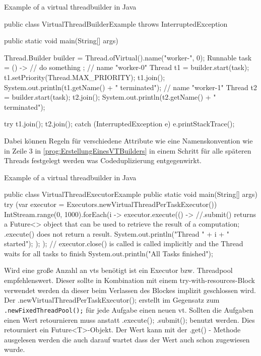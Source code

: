     \begin{program} [H]
        \caption{Example of a virtual threadbuilder in Java}
        \label{prog:ErstellungEinesVTBuilders}
    \begin{JavaCode}[language=Java, numbers=left]
public class VirtualThreadBuilderExample throws InterruptedException{
    public static void main(String[] args) {
        Thread.Builder builder = Thread.ofVirtual().name("worker-", 0);
        Runnable task = () -> {
            // do something
        };
        // name "worker-0"
        Thread t1 = builder.start(task);
        t1.setPriority(Thread.MAX_PRIORITY);   
        t1.join();
        System.out.println(t1.getName() + " terminated");
        // name "worker-1"
        Thread t2 = builder.start(task);   
        t2.join();  
        System.out.println(t2.getName() + " terminated");

        try {
            t1.join(); t2.join();
        } catch (InterruptedException e) {
            e.printStackTrace();
        }
    }
}
    \end{JavaCode}
    \end{program}

    Dabei können Regeln für verschiedene Attribute wie eine Namenskonvention wie in Zeile 3 in \ref{prog:ErstellungEinesVTBuilders}
    in einem Schritt für alle späteren Threads festgelegt werden was Codeduplizierung entgegenwirkt.

    \begin{program} [H]
        \caption{Example of a virtual threadbuilder in Java}
        \label{prog:ErstellungEinesExecutors}
    \begin{JavaCode}[language=Java, numbers=left]
public class VirtualThreadExecutorExample {
    public static void main(String[] args) {
        try (var executor = Executors.newVirtualThreadPerTaskExecutor()){
            IntStream.range(0, 1000).forEach(i -> {
                executor.execute(() -> {     //.submit() returns a Future<> object that can be used to retrieve the result of a computation; .execute() does not return a result.
                    System.out.println("Thread " + i + " started");
                });
            });
        }       // executor.close() is called is called implicitly and the Thread waits for all tasks to finish
        System.out.println("All Tasks finished"); 
    }
}
    \end{JavaCode}
    \end{program}

    Wird eine große Anzahl an \Glspl{vt} benötigt  ist ein Executor bzw. Threadpool empfehlenswert. Dieser sollte in Kombination mit einem
    try-with-resources-Block verwendet werden da dieser beim Verlassen des Blockes implizit geschlossen wird. Der .newVirtualThreadPerTaskExecutor();
    erstellt im Gegensatz zum \texttt{.newFixedThreadPool();} für jede Aufgabe einen neuen \gls{vt}.
    Sollten die Aufgaben einen Wert retournieren muss anstatt .execute(); .submit(); benutzt werden. Dies retourniert ein Future<T>-Objekt. Der Wert kann mit der
    .get() - Methode ausgelesen werden die auch darauf wartet dass der Wert auch schon zugewiesen wurde.
    \cite{oracle21VritualThreads}


